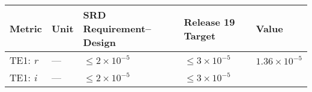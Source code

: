 \documentclass[DM,lsstdraft,toc]{lsstdoc}
\begin{document}
\begin{longtable}[]{@{}lllll@{}}
\toprule
\begin{minipage}[b]{0.13\columnwidth}\raggedright\strut
Metric\strut
\end{minipage} & \begin{minipage}[b]{0.05\columnwidth}\raggedright\strut
Unit\strut
\end{minipage} & \begin{minipage}[b]{0.24\columnwidth}\raggedright\strut
SRD Requirement--Design\strut
\end{minipage} & \begin{minipage}[b]{0.21\columnwidth}\raggedright\strut
Release 19 Target\strut
\end{minipage} & \begin{minipage}[b]{0.22\columnwidth}\raggedright\strut
Value\strut
\end{minipage}\tabularnewline
\midrule
\endhead
\begin{minipage}[t]{0.13\columnwidth}\raggedright\strut
TE1: \emph{r}\strut
\end{minipage} & \begin{minipage}[t]{0.05\columnwidth}\raggedright\strut
---\strut
\end{minipage} & \begin{minipage}[t]{0.24\columnwidth}\raggedright\strut
\(\leq 2\times 10^{-5}\)\strut
\end{minipage} & \begin{minipage}[t]{0.21\columnwidth}\raggedright\strut
\(\leq 3\times 10^{-5}\)\strut
\end{minipage} & \begin{minipage}[t]{0.22\columnwidth}\raggedright\strut
\(1.36\times 10^{-5}\)\strut
\end{minipage}\tabularnewline
\begin{minipage}[t]{0.13\columnwidth}\raggedright\strut
TE1: \emph{i}\strut
\end{minipage} & \begin{minipage}[t]{0.05\columnwidth}\raggedright\strut
---\strut
\end{minipage} & \begin{minipage}[t]{0.24\columnwidth}\raggedright\strut
\(\leq 2\times 10^{-5}\)\strut
\end{minipage} & \begin{minipage}[t]{0.21\columnwidth}\raggedright\strut
\(\leq 3\times 10^{-5}\)\strut
\end{minipage} & \begin{minipage}[t]{0.22\columnwidth}\raggedright\strut

\end{minipage}
\end{longtable}
\end{document}
